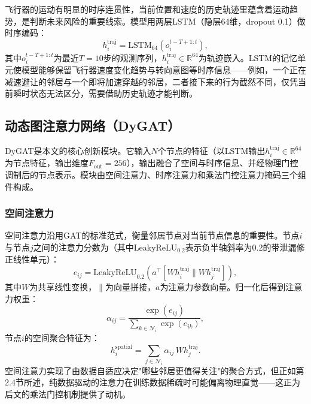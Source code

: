 \documentclass[12pt,a4paper,UTF8]{ctexart}
\begin{document}
飞行器的运动有明显的时序连贯性，当前位置和速度的历史轨迹里蕴含着运动趋势，是判断未来风险的重要线索。模型用两层LSTM（隐层64维，dropout 0.1）做时序编码：
\begin{equation}
    h_i^{\text{traj}} = \text{LSTM}_{64}(o_i^{t-T+1:t}),
    \label{eq:lstm}
\end{equation}
其中$o_i^{t-T+1:t}$为最近$T=10$步的观测序列，$h_i^{\text{traj}}\in\mathbb{R}^{64}$为轨迹嵌入。LSTM的记忆单元使模型能够保留飞行器速度变化趋势与转向意图等时序信息——例如，一个正在减速避让的邻居与一个即将加速穿越的邻居，二者接下来的行为截然不同，仅凭当前瞬时状态无法区分，需要借助历史轨迹才能判断。

\subsection{动态图注意力网络（DyGAT）}

DyGAT是本文的核心创新模块。它输入$N$个节点的特征（以LSTM输出$h_i^{\text{traj}}\in\mathbb{R}^{64}$为节点特征，输出维度$F_{\text{out}}=256$），输出融合了空间与时序信息、并经物理门控调制后的节点表示。模块由空间注意力、时序注意力和乘法门控注意力掩码三个组件构成。

\subsubsection{空间注意力}

空间注意力沿用GAT的标准范式，衡量邻居节点对当前节点信息的重要性。节点$i$与节点$j$之间的注意力分数为（其中LeakyReLU$_{0.2}$表示负半轴斜率为0.2的带泄漏修正线性单元）：
\begin{equation}
    e_{ij} = \text{LeakyReLU}_{0.2}\!\left(a^{\top}[W h_i^{\text{traj}} \parallel W h_j^{\text{traj}}]\right),
    \label{eq:spatial_score}
\end{equation}
其中$W$为共享线性变换，$\parallel$为向量拼接，$a$为注意力参数向量。归一化后得到注意力权重：
\begin{equation}
    \alpha_{ij} = \frac{\exp(e_{ij})}{\sum_{k\in\mathcal{N}_i}\exp(e_{ik})},
    \label{eq:spatial_softmax}
\end{equation}
节点$i$的空间聚合特征为：
\begin{equation}
    h_i^{\text{spatial}} = \sum_{j\in\mathcal{N}_i}\alpha_{ij}\, W h_j^{\text{traj}}.
    \label{eq:spatial_agg}
\end{equation}
空间注意力实现了由数据自适应决定"哪些邻居更值得关注"的聚合方式，但正如第2.4节所述，纯数据驱动的注意力在训练数据稀疏时可能偏离物理直觉——这正为后文的乘法门控机制提供了动机。
\end{document}
